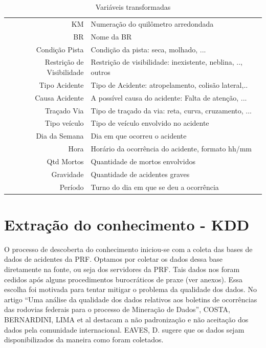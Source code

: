 \begin{table}[htbp!]
	\centering
	\caption{Variáveis transformadas} 
	\begin{tabular}{r|l} \hline
		KM & Numeração do quilômetro arredondada \\
		BR & Nome da BR \\
		Condição Pista & Condição da pista: seca, molhado, ... \\
		Restrição de Visibilidade & Restrição de visibilidade: inexistente, neblina, .., outros \\
		Tipo Acidente & Tipo de Acidente: atropelamento, colisão lateral,..\\
		Causa Acidente & A possível causa do acidente: Falta de atenção, ... \\
		Traçado Via & Tipo de traçado da via: reta, curva, cruzamento, ... \\
		Tipo veículo & Tipo de veículo envolvido no acidente \\
		Dia da Semana & Dia em que ocorreu o acidente\\
		Hora & Horário da ocorrência do acidente, formato hh/mm \\
		Qtd Mortos & Quantidade de mortos envolvidos \\
		Gravidade & Quantidade de acidentes graves \\
		Período & Turno do dia em que se deu a ocorrência \\
	\end{tabular}
\end{table}
 
\vspace{7mm}

\pagebreak

\section{Extração do conhecimento - KDD}

O processo de descoberta do conhecimento iniciou-se com a coleta das bases de dados de acidentes da PRF. Optamos por coletar os dados dessa base diretamente na fonte,
ou seja dos servidores da PRF. Tais dados nos foram cedidos após alguns procedimentos burocráticos de praxe (ver anexos). Essa escolha foi motivada para tentar
mitigar o problema da qualidade dos dados. No artigo ``Uma análise da qualidade dos dados relativos aos boletins de ocorrências das rodovias federais para o processo de Mineração de Dados'', COSTA, BERNARDINI, LIMA et al \cite{Costa2015} destacam a não padronização e não aceitação dos dados pela comunidade internacional. EAVES, D. \cite{Eaves} sugere que os dados sejam disponibilizados da maneira como foram coletados.

